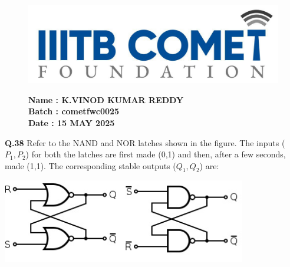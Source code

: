 \documentclass{article}
\begin{document}
\begin{figure}[h!]
    \begin{minipage}{0.45\textwidth}  %
        \includegraphics[width=\textwidth]{ki.png}  %
    \end{minipage} \hfill
    \begin{minipage}{0.45\textwidth}  %
        \textbf{Name : K.VINOD KUMAR REDDY} \\
    \textbf{Batch : cometfwc0025} \\
  \textbf{Date : 15 MAY 2025}
    \end{minipage}
\end{figure}
\noindent\textbf{Q.38} \quad Refer to the NAND and NOR latches shown in the figure. The inputs ($P_1, P_2$) for both the latches are first made (0,1) and then, after a few seconds, made (1,1). The corresponding stable outputs ($Q_1, Q_2$) are:

\vspace{1em}

\begin{center}
    \includegraphics[width=0.8\textwidth]{sr.png} %
\end{center}

\vspace{1em}
\end{document}

